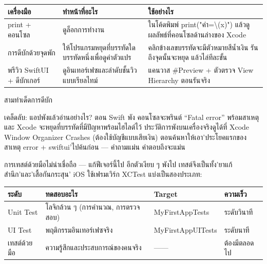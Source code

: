 


\begin{center}
\begin{tabularx}{\linewidth}{|X|X|X|}
\hline
\textbf{เครื่องมือ} & \textbf{ทำหน้าที่อะไร} & \textbf{ใช้อย่างไร} \tabularnewline
\hline
print + คอนโซล & ดูล็อกการทำงาน & ในโค้ดพิมพ์ print("ค่า=\textbackslash{}(x)") แล้วดูผลลัพธ์ที่คอนโซลด้านล่างของ Xcode \tabularnewline
การดีบักด้วยจุดพัก & ให้โปรแกรมหยุดที่บรรทัดใดบรรทัดหนึ่งเพื่อดูค่าตัวแปร & คลิกข้างเลขบรรทัดจะมีตัวหมายสีน้ำเงิน รันถึงจุดนั้นจะหยุด แล้วไล่ทีละขั้น \tabularnewline
พรีวิว SwiftUI + ดีบักเกอร์ & ดูอินเทอร์เฟซและลำดับชั้นวิวแบบเรียลไทม์ & แคนวาส \#Preview + ตัวตรวจ View Hierarchy ตอนรันจริง \tabularnewline
\hline
\end{tabularx}
\end{center}

\begin{center}\small\color{gray}สามท่าเด็ดการดีบัก\end{center}

\begin{tcbinfo}{เคล็ดลับ: แอปพังแล้วอ่านอย่างไร?}
ตอน Swift พัง คอนโซลจะพรินต์ “Fatal error” พร้อมสาเหตุ และ Xcode จะหยุดที่บรรทัดที่มีปัญหาพร้อมไฮไลต์ไว้ ประวัติการพังบนเครื่องจริงดูได้ที่ Xcode Window Organizer Crashes (ต้องใช้บัญชีแบบเสียเงิน) ตอนค้นหาให้เอา'ประโยคแรกของสาเหตุ error + swiftui'ไปค้นก่อน — คำถามแม่น คำตอบถึงจะแม่น

\end{tcbinfo}


การเทสต์ด้วยมือไม่น่าเชื่อถือ — แก้ฟีเจอร์นี้ไป อีกตัวเงียบ ๆ พังไป เทสต์จึงเป็นทั้ง'ยาแก้สำนึก'และ'เสื้อกันกระสุน' iOS ใช้เฟรมเวิร์ก XCTest แบ่งเป็นสองประเภท:

\begin{center}
\begin{tabularx}{\linewidth}{|X|X|X|X|}
\hline
\textbf{ระดับ} & \textbf{ทดสอบอะไร} & \textbf{Target} & \textbf{ความเร็ว} \tabularnewline
\hline
Unit Test & โลจิกล้วน ๆ (การคำนวณ, การตรวจสอบ) & MyFirstAppTests & ระดับวินาที \tabularnewline
UI Test & พฤติกรรมอินเทอร์เฟซจริง & MyFirstAppUITests & ระดับนาที \tabularnewline
เทสต์ด้วยมือ & ความรู้สึกและประสบการณ์ของคนจริง & —— & ต้องมีตลอดไป \tabularnewline
\hline
\end{tabularx}
\end{center}

